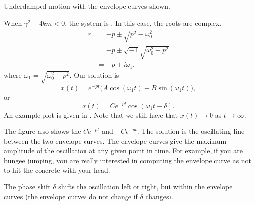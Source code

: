 \begin{mywrapfig}[15]{3.25in}
\capstart
{}
\caption{Underdamped motion with the envelope curves shown.\label{mv:underdampedfig}}
\end{mywrapfig}
%
%
When
$\gamma^2 - 4km < 0$, the system is \emph{}.  In this case,
the roots are complex.
\begin{equation*}
\begin{split}
r & =
-p \pm \sqrt{p^2 - \omega_0^2} \\
& = 
-p \pm \sqrt{-1}\sqrt{\omega_0^2 - p^2} \\
& = 
-p \pm i \omega_1 ,
\end{split}
\end{equation*}
where $\omega_1 =\sqrt{\omega_0^2 - p^2}$.  Our solution is
\begin{equation*}
x(t) = e^{-pt} \bigl( A \cos (\omega_1 t) + B \sin (\omega_1 t) \bigr) ,
\end{equation*}
or
\begin{equation*}
x(t) = C e^{-pt} \cos ( \omega_1 t - \delta ) .
\end{equation*}
An example plot is given in .  Note that we
still have that $x(t) \to 0$ as $t \to \infty$.


The figure also 
shows the \emph{}
$C e^{-pt}$ and $-C e^{-pt}$.  The solution
is the oscillating line between the two envelope curves.
The envelope curves give
the maximum amplitude of the oscillation at any given point in time.  For
example, if you are bungee jumping, you are really interested in computing the
envelope curve as not to hit the concrete with your head.

The phase shift $\delta$ shifts the oscillation left or right, but within the
envelope curves (the envelope curves do not change if $\delta$
changes).


